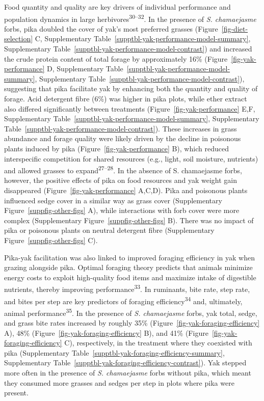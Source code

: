 \documentclass[
  letterpaper,
  DIV=11,
  numbers=noendperiod]{scrartcl}
\begin{document}
Food quantity and quality are key drivers of individual performance and
population dynamics in large herbivores\textsuperscript{30--32}. In the
presence of \emph{S. chamaejasme} forbs, pika doubled the cover of yak's
most preferred grasses (Figure~\ref{fig-diet-selection} C,
Supplementary Table~\ref{supptbl-yak-performance-model-summary},
Supplementary Table~\ref{supptbl-yak-performance-model-contrast}) and
increased the crude protein content of total forage by approximately
16\% (Figure~\ref{fig-yak-performance} D,
Supplementary Table~\ref{supptbl-yak-performance-model-summary},
Supplementary Table~\ref{supptbl-yak-performance-model-contrast}),
suggesting that pika facilitate yak by enhancing both the quantity and
quality of forage. Acid detergent fibre (6\%) was higher in pika plots,
while ether extract also differed significantly between treatments
(Figure~\ref{fig-yak-performance} E,F,
Supplementary Table~\ref{supptbl-yak-performance-model-summary},
Supplementary Table~\ref{supptbl-yak-performance-model-contrast}). These
increases in grass abundance and forage quality were likely driven by
the decline in poisonous plants induced by pika
(Figure~\ref{fig-yak-performance} B), which reduced interspecific
competition for shared resources (e.g., light, soil moisture, nutrients)
and allowed grasses to expand\textsuperscript{27--28}. In the absence of
S. chamaejasme forbs, however, the positive effects of pika on food
resources and yak weight gain disappeared
(Figure~\ref{fig-yak-performance} A,C,D). Pika and poisonous plants
influenced sedge cover in a similar way as grass cover
(Supplementary Figure~\ref{suppfig-other-figs} A), while interactions
with forb cover were more complex
(Supplementary Figure~\ref{suppfig-other-figs} B). There was no impact
of pika or poisonous plants on neutral detergent fibre
(Supplementary Figure~\ref{suppfig-other-figs} C).

Pika-yak facilitation was also linked to improved foraging efficiency in
yak when grazing alongside pika. Optimal foraging theory predicts that
animals minimize energy costs to exploit high-quality food items and
maximize intake of digestible nutrients, thereby improving
performance\textsuperscript{33}. In ruminants, bite rate, step rate, and
bites per step are key predictors of foraging
efficiency\textsuperscript{34} and, ultimately, animal
performance\textsuperscript{35}. In the presence of \emph{S.
chamaejasme} forbs, yak total, sedge, and grass bite rates increased by
roughly 35\% (Figure~\ref{fig-yak-foraging-efficiency} A), 48\%
(Figure~\ref{fig-yak-foraging-efficiency} B), and 41\%
(Figure~\ref{fig-yak-foraging-efficiency} C), respectively, in the
treatment where they coexisted with pika
(Supplementary Table~\ref{supptbl-yak-foraging-efficiency-summary},
Supplementary Table~\ref{supptbl-yak-foraging-efficiency-contrast}). Yak
stepped more often in the presence of \emph{S. chamaejasme} forbs
without pika, which meant they consumed more grasses and sedges per step
in plots where pika were present.
\end{document}
